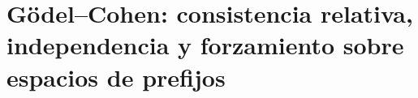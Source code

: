 \chapter{Gödel--Cohen: consistencia relativa, independencia y forzamiento sobre espacios de prefijos}
\label{chap:p3-final:55:godel_cohen}

